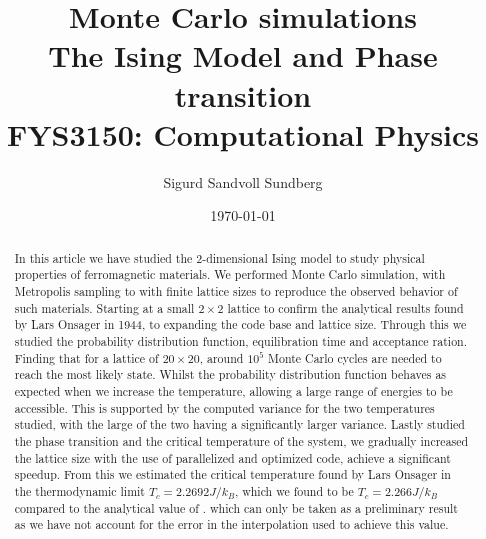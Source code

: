 \documentclass[%
reprint,
nofootinbib,
amsmath,amssymb,
aps,
]{revtex4-1}
\begin{document}
	
\title{Monte Carlo simulations\\
	\normalsize{The Ising Model and Phase transition} \\
	\hrulefill\small{ FYS3150: Computational Physics }\hrulefill}

\author{Sigurd Sandvoll Sundberg}

%

\date{\today}

\begin{abstract}%
In this article we have studied the 2-dimensional Ising model to study physical properties of ferromagnetic materials. We performed Monte Carlo simulation, with Metropolis sampling to with finite lattice sizes to reproduce the observed behavior of such materials. Starting at a small $2\times 2$ lattice to confirm the analytical results found by Lars Onsager\cite{LarsOnsager} in 1944, to expanding the code base and lattice size. Through this we studied the probability distribution function, equilibration time and acceptance ration. Finding that for a lattice of $20\times 20$, around $10^5$ Monte Carlo cycles are needed to reach the most likely state. Whilst the probability distribution function behaves as expected when we increase the temperature, allowing a large range of energies to be accessible. This is supported by the computed variance for the two temperatures studied, with the large of the two having a significantly larger variance. Lastly studied the phase transition and the critical temperature of the system, we gradually increased the lattice size with the use of parallelized and optimized code, achieve a significant speedup. From this we estimated the critical temperature found by Lars Onsager in the thermodynamic limit $T_c = 2.2692J/k_B$, which we found to be $T_c = 2.266J/k_B$ compared to the analytical value of . which can only be taken as a preliminary result as we have not account for the error in the interpolation used to achieve this value. 
\end{abstract}

\maketitle 
\end{document}
